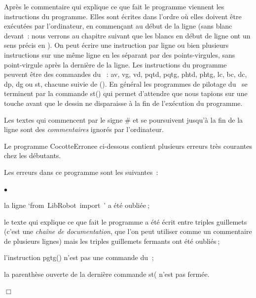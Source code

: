 Après le commentaire qui explique ce que fait le programme
viennent les instructions 
du programme. Elles sont écrites dans l'ordre où elles doivent être exécutées par
l'or\-di\-na\-teur, en commençant au début de la ligne (sans blanc devant~: nous verrons 
au chapitre suivant que les blancs en début de ligne ont un sens précis en \python). 
On peut écrire une instruction par ligne ou bien plusieurs instructions sur une même ligne 
en les séparant par des points-virgules, sans point-virgule après la dernière de la ligne. 
Les instructions du programme
peuvent être des commandes du \hbox{\robot\ :} {\idt av}, {\idt vg}, {\idt vd}, {\idt pqtd}, 
{\idt pqtg}, {\idt phtd}, {\idt phtg}, {\idt lc}, {\idt bc}, {\idt dc}, {\idt dp}, 
{\idt dg} ou {\idt st}, chacune suivie de {\idt ()}. En général les programmes de pilotage du \robot\ se
terminent par la commande {\idt st()} qui permet d'attendre que nous
tapions sur une touche avant que le dessin ne 
disparaisse à la fin de l'exécution du programme.

Les textes qui commencent par le signe {\cmt \#} et se poursuivent jusqu'à la fin de 
la ligne sont des {\em commentaires} ignorés par l'ordinateur.

Le pro\-gram\-me
{\idt CocotteErronee} ci-dessous contient
plusieurs erreurs très courantes chez les débutants.

\begin{exemple}{\hfill

\label{prog:Cocotte-errone} 
\noindent Les erreurs dans ce programme sont les \hbox{suivantes :}
\begin{list}{$\scriptscriptstyle\bullet$}{
\renewcommand{\labelwidth}{3mm}
\renewcommand{\labelsep}{3mm}
\renewcommand{\leftmargin}{10mm}
\renewcommand{\rightmargin}{0mm}
}
\item[1.] la ligne `{\mcl from}\ {\idt LibRobot}\ {\mcl import}\ {\idt *}' a été oubliée$\:$;
\item[2.] le texte qui explique ce que fait le programme a été écrit entre triples 
guillemets {\cha {}} (c'est une {\em chaîne de documentation}, que l'on 
peut utiliser comme un commentaire de plusieurs lignes) mais les triples guillemets 
fermants {\cha {}} ont été oubliés$\:$;
\item[3.] l'instruction {\idt pgtg()} n'est pas une commande du \robotErr$\:$;
\item[4.] la parenthèse ouverte de la dernière commande {\idt st(} n'est pas fermée.
\end{list}
\noindent $\Box$ }\end{exemple}


